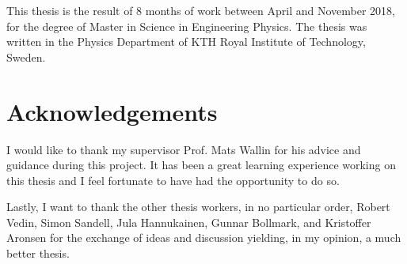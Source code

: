 This thesis is the result of 8 months of work between April and November 2018, for the degree of Master in Science in Engineering Physics. The thesis was written in the Physics Department of KTH Royal Institute of Technology, Sweden.

\section*{Acknowledgements}

I would like to thank my supervisor Prof. Mats Wallin for his advice and guidance during this project. It has been a great learning experience working on this thesis and I feel fortunate to have had the opportunity to do so.

Lastly, I want to thank the other thesis workers, in no particular order, Robert Vedin, Simon Sandell, Jula Hannukainen, Gunnar Bollmark, and Kristoffer Aronsen for the exchange of ideas and discussion yielding, in my opinion, a much better thesis.